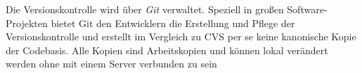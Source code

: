 Die Versionskontrolle wird über \textit{Git} verwaltet. Speziell in großen Software-Projekten bietet Git den Entwicklern die Erstellung und Pflege der Versionskontrolle und erstellt im Vergleich zu CVS per se keine kanonische Kopie der Codebasis. Alle Kopien sind Arbeitskopien und können lokal verändert werden ohne mit einem Server verbunden zu sein \cite{Russell:2019}
